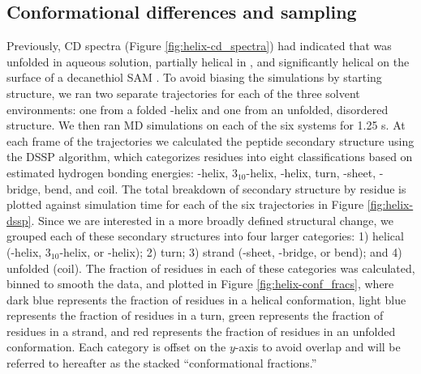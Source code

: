 \subsection{Conformational differences and sampling}

Previously, CD spectra (Figure \ref{fig:helix-cd_spectra}) had indicated that \pep{} was unfolded in aqueous solution, partially helical in \tbawat{}, and significantly helical on the surface of a decanethiol SAM \cite{Gallardo2012}. 
To avoid biasing the simulations by starting structure, we ran two separate trajectories for each of the three solvent environments: one from a folded \textalpha{}-helix and one from an unfolded, disordered structure. 
We then ran MD simulations on each of the six systems for 1.25 \textmu{}s. 
At each frame of the trajectories we calculated the peptide secondary structure using the DSSP algorithm\cite{Kabsch1983, Joosten2011}, which categorizes residues into eight classifications based on estimated hydrogen bonding energies: \textalpha{}-helix, $3_{10}$-helix, \textpi{}-helix, turn, \textbeta{}-sheet, \textbeta{}-bridge, bend, and coil. 
The total breakdown of secondary structure by residue is plotted against simulation time for each of the six trajectories in Figure \ref{fig:helix-dssp}. 
Since we are interested in a more broadly defined structural change, we grouped each of these secondary structures into four larger categories: 1) helical (\textalpha{}-helix, $3_{10}$-helix, or \textpi{}-helix); 2) turn; 3) strand (\textbeta{}-sheet, \textbeta{}-bridge, or bend); and 4) unfolded (coil). 
The fraction of residues in each of these categories was calculated, binned to smooth the data, and plotted in Figure \ref{fig:helix-conf_fracs}, where dark blue represents the fraction of residues in a helical conformation, light blue represents the fraction of residues in a turn, green represents the fraction of residues in a strand, and red represents the fraction of residues in an unfolded conformation. 
Each category is offset on the $y$-axis to avoid overlap and will be referred to hereafter as the stacked ``conformational fractions.'' 

